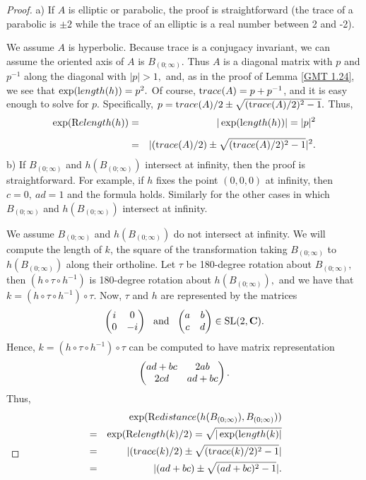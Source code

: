 \begin{proof}{}  a)  If $A$ is elliptic or parabolic, the proof is straightforward (the trace of a parabolic is $\pm 2$ while the trace of an elliptic
is a real number between 2 and -2).  

We assume $A$ is hyperbolic.  Because trace is a conjugacy invariant, we can assume the oriented axis of $A$ is $ B_{(0;\infty)}.$  Thus $A$ is a diagonal matrix with $p$ and $p^{-1}$ along the diagonal with 
$|p| > 1,$ and, as in the proof of Lemma \ref{GMT 1.24}, we see that 
$\exp({\textrm length}(h)) = p^2.$  Of course,  ${\textrm trace}(A)= p + p^{-1}$, and it is easy enough to solve for $p.$   Specifically, 
$p = {\textrm trace}(A)/2 \pm \sqrt{({\textrm trace}(A)/2)^2 - 1}.$
Thus, 
\begin{eqnarray*}
\exp({\textrm Relength} (h))& =& |\exp({\textrm length}(h))|  = 
|p|^2\\[5pt]
&=& |({\textrm trace}(A)/2) \pm \sqrt{({\textrm trace}(A)/2)^2 - 1}|^2.
\end{eqnarray*}
b)  If $ B_{(0;\infty)}$ and $h(B_{(0;\infty)})$ intersect at infinity, then the proof is straightforward.  For example, 
if $h$ fixes the point $(0,0,0)$ at infinity, then $c = 0,\ ad = 1$ and the formula holds.  Similarly for the other cases in which $ B_{(0;\infty)}$ and $h(B_{(0;\infty)})$ intersect at infinity.

We assume $ B_{(0;\infty)}$ and $h(B_{(0;\infty)})$ do not intersect at infinity. We will compute the length of $k$, the square of the transformation taking $ B_{(0;\infty)}$ to $h(B_{(0;\infty)})$ along their ortholine. 
Let $\tau$ be 180-degree rotation about $ B_{(0;\infty)},$ then $(h \circ \tau \circ h^{-1})$ is 180-degree rotation about $h(B_{(0;\infty)}),$ and
we have that  $k = (h \circ \tau \circ h^{-1}) \circ \tau.$   
Now, $\tau$ and $h$ are represented by the matrices 
$$ \left(\begin{matrix} i & 0 \cr 
0  & -i \cr\end{matrix} \right) \mathrm {\ \ and\ \ } 
                         \left(\begin{matrix} a & b \cr 
			 c  & d \cr\end{matrix} \right)  \in \mathrm {SL}(2,\mathbf {C}).$$ 
Hence,   $k = (h \circ \tau \circ h^{-1}) \circ \tau$ can be computed to have matrix
representation $$\left(\begin{matrix} ad + bc & 2ab \cr 
2cd & ad + bc \cr\end{matrix} \right).$$ 
Thus,
\begin{eqnarray*}
&&\hskip-66pt\exp({\textrm Redistance} (h(B_{(0;\infty)}), B_{(0;\infty)}))\\
& = &
\exp(\Relength(k)/2)= \sqrt{|\exp(\length(k)|}\\
& =&
|(\trace(k)/2) \pm \sqrt{(\trace(k)/2)^2 - 1}|\\
& =&
|(ad + bc) \pm \sqrt{(ad + bc)^2 - 1}|. \\
\noalign{\vskip-36pt}
\end{eqnarray*}
\end{proof}

